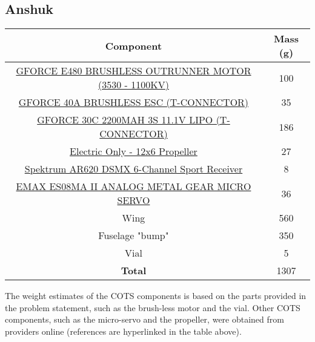     \subsection{Anshuk}
    \begin{table}[H]
        \begin{tabular}{|c|c| } %
            \hline \textbf{Component} & \textbf{Mass (g)} \\ \hline %
            \href{https://www.amazon.com/Brushless-Outrunner-Multicopters-Helicopter-Control/dp/B08MKQFSVF/ref=asc_df_B08MKQFSVF/?tag=hyprod-20&linkCode=df0&hvadid=475795164185&hvpos=&hvnetw=g&hvrand=9902342740412303481&hvpone=&hvptwo=&hvqmt=&hvdev=c&hvdvcmdl=&hvlocint=&hvlocphy=2840&hvtargid=pla-1195392311214&th=1}{GFORCE E480 BRUSHLESS OUTRUNNER MOTOR (3530 - 1100KV)} & 100 \\ \hline
            \href{http://www.valuehobby.com/gforce-40a-esc.html}{GFORCE 40A BRUSHLESS ESC (T-CONNECTOR)} & 35 \\ \hline
            \href{http://www.valuehobby.com/30c-2200mah-3s-t.html}{GFORCE 30C 2200MAH 3S 11.1V LIPO (T-CONNECTOR)} & 186 \\ \hline
            \href{https://www.masterairscrew.com/products/electric-only-12x6-propeller?currency=USD&utm_medium=cpc&utm_source=google&utm_campaign=Google\%20Shopping&gclid=CjwKCAiA9aKQBhBREiwAyGP5laqPgb8z2BGon5sD8qHYRZQVab7IcA0DZg8DOcFMsDTccBgRqirzgBoC1wkQAvD_BwE}{Electric Only - 12x6 Propeller} & 27 \\ \hline
            \href{https://www.hogrizonhobby.com/product/ar620-dsmx-6-channel-sport-receiver/SPMAR620.html?gclid=CjwKCAiA9aKQBhBREiwAyGP5lX6-hyQKl87DI0WH0pgWG2HS0woZKcd-L2bMRS_qWmVI1fLqpeCX0BoCrRAQAvD_BwE}{Spektrum AR620 DSMX 6-Channel Sport Receiver} & 8 \\ \hline
            \href{https://arrishobby.com/emax-es08ma-ii-12g-mini-metal-gear-analog-servo-p0842.html?VariantsId=12700}{EMAX ES08MA II ANALOG METAL GEAR MICRO SERVO} & 36 \\ \hline
            Wing & 560 \\ \hline
            Fuselage "bump" & 350 \\ \hline
            Vial & 5 \\ \hline
            \textbf{Total} & 1307 \\ \hline
        \end{tabular}
        \end{table}
        The weight estimates of the COTS components is based on the parts provided in the problem statement, such as the brush-less motor and the vial. Other COTS components, such as the micro-servo and the propeller, were obtained from providers online (references are hyperlinked in the table above). 
        
